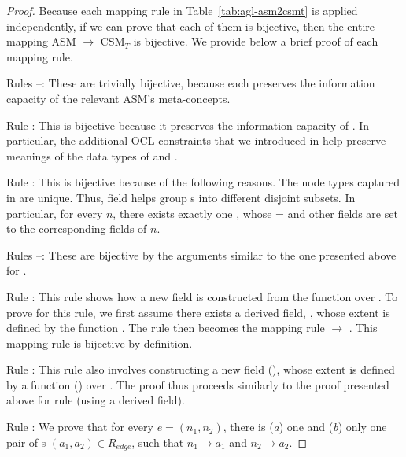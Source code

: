 \begin{proof}
	Because each mapping rule in Table~\ref{tab:agl-asm2csmt} is applied independently, if we can prove that each of them is bijective, then the entire mapping ASM $\rightarrow$ CSM$_T$ is bijective. We provide below a brief proof of each mapping rule.
	
	Rules --: These are trivially bijective, because each preserves the information capacity of the relevant ASM's meta-concepts.
	
	Rule : This is bijective because it preserves the information capacity of . In particular, the additional OCL constraints that we introduced in  help preserve meanings of the data types of  and .
	
	Rule : This is bijective because of the following reasons. The node types captured in  are unique. Thus, field  helps group s into different disjoint subsets. In particular, for every  $n$, there exists exactly one , whose  =  and other fields are set to the corresponding fields of $n$. 
	
	Rules --: These are bijective by the arguments similar to the one presented above for .
	
	Rule : This rule shows how a new field  is constructed from the function  over . To prove for this rule, we first assume there exists a derived field, , whose extent is defined by the function . The rule  then becomes the mapping rule  $ \rightarrow $ . This mapping rule is bijective by definition.
	
	Rule : This rule also involves constructing a new field (), whose extent is defined by a function () over . The proof thus proceeds similarly to the proof presented above for rule  (\ie using a derived field).
	
	Rule : We prove that for every  $ e = (n_1, n_2) $, there is (\textit{a}) one and (\textit{b}) only one pair of s $ (a_1, a_2) \in R_{edge} $, such that $ n_1 \rightarrow a_1$ and $ n_2 \rightarrow a_2 $.
	

\end{proof}
